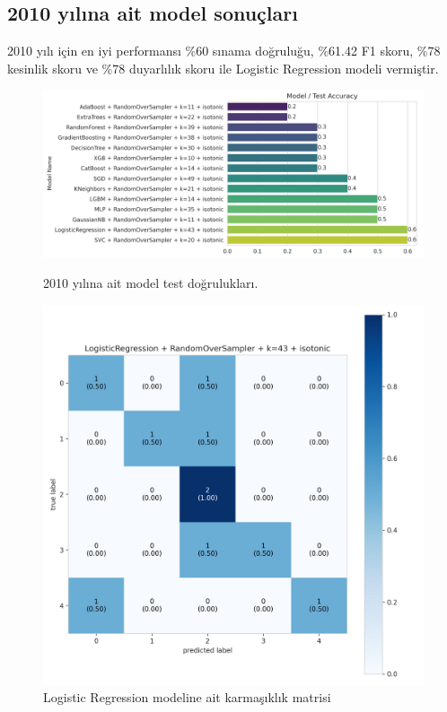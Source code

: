 \newpage

\subsection{2010 yılına ait model sonuçları}
2010 yılı için en iyi performansı \%60 sınama doğruluğu,  \%61.42 F1 skoru, \%78 kesinlik skoru ve \%78 duyarlılık skoru ile Logistic Regression modeli vermiştir.

\begin{figure}[ht]
\centering
\begin{minipage}[b]{0.6\textwidth}
    \centering
    \includegraphics[width=\textwidth]{2010.png}
    \caption{2010 yılına ait model test doğrulukları.}
    \label{fig:resim1}
\end{minipage}
\hfill
\begin{minipage}[b]{0.6\textwidth}
    \centering
    \includegraphics[width=\textwidth]{2010_cm.png}
    \caption{Logistic Regression modeline ait karmaşıklık matrisi}
    \label{fig:resim2}
\end{minipage}
\end{figure}

